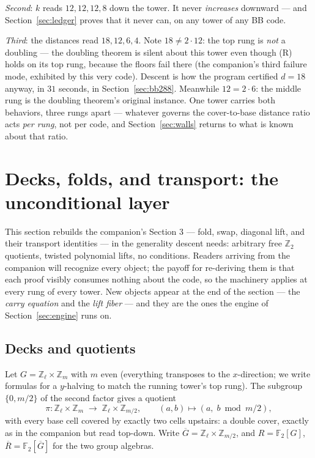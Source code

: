 \documentclass[11pt]{article}
\theoremstyle{plain}
\theoremstyle{definition}
\theoremstyle{remark}
\newcommand{\F}{\mathbb{F}}
\newcommand{\Z}{\mathbb{Z}}
\newcommand{\Rbase}{\overline{R}}
\newcommand{\Rcov}{R}
\newcommand{\ov}[1]{\overline{#1}}
\begin{document}
\emph{Second}: $k$ reads $12, 12, 12, 8$ down the tower. It never
\emph{increases} downward --- and Section~\ref{sec:ledger} proves that it
never can, on any tower of any BB code.

\emph{Third}: the distances read $18, 12, 6, 4$. Note $18 \neq 2 \cdot
12$: the top rung is \emph{not} a doubling --- the doubling theorem is
silent about this tower even though (R) holds on its top rung, because the
floors fail there (the companion's third failure mode, exhibited by this
very code). Descent is how the program certified $d = 18$ anyway, in
$31$ seconds, in Section~\ref{sec:bb288}. Meanwhile $12 = 2 \cdot 6$: the
middle rung is the doubling theorem's original instance. One tower
carries both behaviors, three rungs apart --- whatever governs the
cover-to-base distance ratio acts \emph{per rung}, not per code, and
Section~\ref{sec:walls} returns to what is known about that ratio.

\section{Decks, folds, and transport: the unconditional layer}
\label{sec:transport}

This section rebuilds the companion's Section 3 --- fold, swap, diagonal
lift, and their transport identities --- in the generality descent needs:
arbitrary free $\Z_2$ quotients, twisted polynomial lifts, no conditions.
Readers arriving from the companion will recognize every object; the
payoff for re-deriving them is that each proof visibly consumes nothing
about the code, so the machinery applies at every rung of every tower.
New objects appear at the end of the section --- the \emph{carry equation}
and the \emph{lift fiber} --- and they are the ones the engine of
Section~\ref{sec:engine} runs on.

\subsection{Decks and quotients}
\label{sec:decks}

Let $G = \Z_\ell \times \Z_m$ with $m$ even (everything transposes to the
$x$-direction; we write formulas for a $y$-halving to match the running
tower's top rung). The subgroup $\{0, m/2\}$ of the second factor gives a
quotient
\[
\pi : \Z_\ell \times \Z_m \;\to\; \Z_\ell \times \Z_{m/2},
\qquad (a, b) \mapsto (a,\; b \bmod m/2),
\]
with every base cell covered by exactly two cells upstairs: a double
cover, exactly as in the companion but read top-down. Write
$\ov{G} = \Z_\ell \times \Z_{m/2}$, and $\Rcov = \F_2[G]$,
$\Rbase = \F_2[\ov{G}]$ for the two group algebras.
\end{document}
